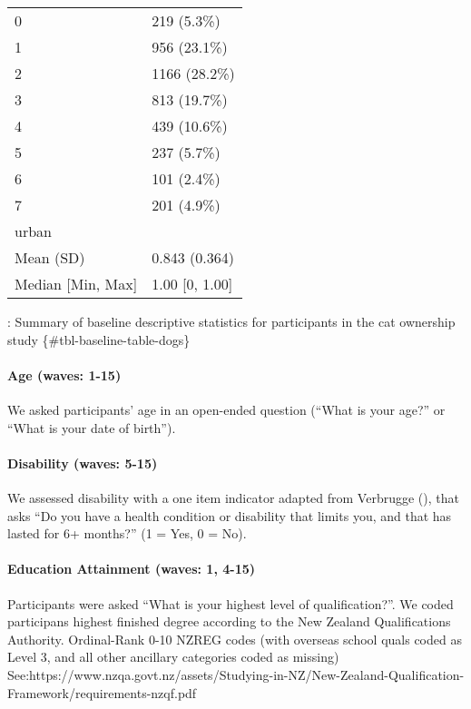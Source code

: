 \documentclass[
  singlecolumn,
  9pt]{article}
\let\oldparagraph\paragraph
\renewcommand{\paragraph}[1]{\oldparagraph{#1}\mbox{}}
\begin{document}
\begin{longtable}[]{@{}ll@{}}
0 & 219 (5.3\%) \\
1 & 956 (23.1\%) \\
2 & 1166 (28.2\%) \\
3 & 813 (19.7\%) \\
4 & 439 (10.6\%) \\
5 & 237 (5.7\%) \\
6 & 101 (2.4\%) \\
7 & 201 (4.9\%) \\
urban & \\
Mean (SD) & 0.843 (0.364) \\
Median {[}Min, Max{]} & 1.00 {[}0, 1.00{]} \\
\end{longtable}

: Summary of baseline descriptive statistics for participants in the cat
ownership study \{\#tbl-baseline-table-dogs\}

\paragraph{Age (waves: 1-15)}\label{age-waves-1-15}

We asked participants' age in an open-ended question (``What is your
age?'' or ``What is your date of birth'').

\paragraph{Disability (waves: 5-15)}\label{disability-waves-5-15}

We assessed disability with a one item indicator adapted from Verbrugge
(), that asks ``Do you have a health
condition or disability that limits you, and that has lasted for 6+
months?'' (1 = Yes, 0 = No).

\paragraph{Education Attainment (waves: 1,
4-15)}\label{education-attainment-waves-1-4-15}

Participants were asked ``What is your highest level of
qualification?''. We coded participans highest finished degree according
to the New Zealand Qualifications Authority. Ordinal-Rank 0-10 NZREG
codes (with overseas school quals coded as Level 3, and all other
ancillary categories coded as missing)
See:https://www.nzqa.govt.nz/assets/Studying-in-NZ/New-Zealand-Qualification-Framework/requirements-nzqf.pdf
\end{document}
